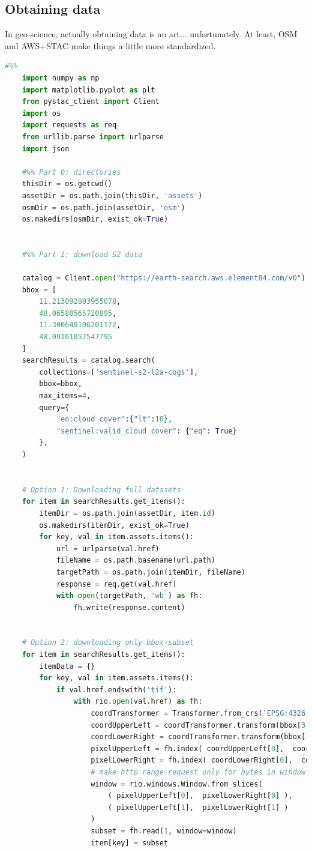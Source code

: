 \subsection{Obtaining data}
In geo-science, actually obtaining data is an art... unfortunately. At least, OSM and AWS+STAC make things a little more standardized.

\begin{lstlisting}[language=python]
    #%%
    import numpy as np
    import matplotlib.pyplot as plt
    from pystac_client import Client
    import os
    import requests as req
    from urllib.parse import urlparse
    import json
    
    #%% Part 0: directories
    thisDir = os.getcwd()
    assetDir = os.path.join(thisDir, 'assets')
    osmDir = os.path.join(assetDir, 'osm')
    os.makedirs(osmDir, exist_ok=True)
    
    
    #%% Part 1: download S2 data
    
    catalog = Client.open("https://earth-search.aws.element84.com/v0")
    bbox = [
        11.213092803955078,
        48.06580565720895,
        11.300640106201172,
        48.09161057547795
    ]
    searchResults = catalog.search(
        collections=['sentinel-s2-l2a-cogs'],
        bbox=bbox,
        max_items=4,
        query={
            "eo:cloud_cover":{"lt":10},
            "sentinel:valid_cloud_cover": {"eq": True}
        },
    )
    
    
    # Option 1: Downloading full datasets
    for item in searchResults.get_items():
        itemDir = os.path.join(assetDir, item.id)
        os.makedirs(itemDir, exist_ok=True)
        for key, val in item.assets.items():
            url = urlparse(val.href)
            fileName = os.path.basename(url.path)
            targetPath = os.path.join(itemDir, fileName)
            response = req.get(val.href)
            with open(targetPath, 'wb') as fh:
                fh.write(response.content)
    

    # Option 2: downloading only bbox-subset
    for item in searchResults.get_items():
        itemData = {}
        for key, val in item.assets.items():
            if val.href.endswith('tif'):
                with rio.open(val.href) as fh:
                    coordTransformer = Transformer.from_crs('EPSG:4326', fh.crs)
                    coordUpperLeft = coordTransformer.transform(bbox[3], bbox[0])
                    coordLowerRight = coordTransformer.transform(bbox[1], bbox[2]) 
                    pixelUpperLeft = fh.index( coordUpperLeft[0],  coordUpperLeft[1] )
                    pixelLowerRight = fh.index( coordLowerRight[0],  coordLowerRight[1] )
                    # make http range request only for bytes in window
                    window = rio.windows.Window.from_slices(
                        ( pixelUpperLeft[0],  pixelLowerRight[0] ), 
                        ( pixelUpperLeft[1],  pixelLowerRight[1] )
                    )
                    subset = fh.read(1, window=window)
                    item[key] = subset
    

\end{lstlisting}
